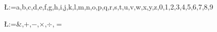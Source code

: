 \documentclass[a4paper]{article}
\newcommand{\outerbox}[1]{\framebox{#1}}
\renewcommand{\outerbox}[1]{#1}
\begin{document}
\pagestyle{empty}

\setlength{\fboxsep}{30pt}

\makeatletter
\@for\L:={a,b,c,d,e,f,g,h,i,j,k,l,m,n,o,p,q,r,s,t,u,v,w,x,y,z,0,1,2,3,4,5,6,7,8,9}\do{
  ~

  \vfill

  \centering\noindent\outerbox{\resizebox*{0.86\textwidth}{!}{\makebox[2.5em]{\Huge\strut\L}}}

  \vfill
  ~

  \pagebreak}

\@for\L:={\&,$+$,$-$,$\times$,$\div$,$=$}\do{
  ~

  \vfill

  \centering\noindent\outerbox{\scalebox{1.75}{\fontsize{250}{260}\selectfont{\strut\L}}}

  \vfill
  ~

  \pagebreak}


\makeatother
\end{document}
